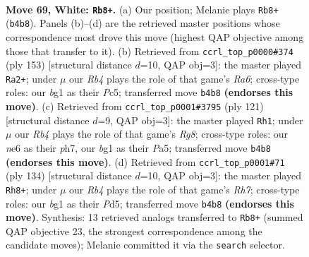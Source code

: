 \documentclass[11pt]{article}
\begin{document}
\clearpage

\begin{figure}[p]\centering
\begin{subfigure}{0.46\textwidth}\centering
\resizebox{\linewidth}{!}{%
\newchessgame
\chessboard[
  setfen={7k/8/3Nn3/P7/1R6/7r/2K5/6b1 w - - 5 69},
  showmover=false,
  pgfstyle=straightmove, color=movearrow, markmove={b4-b8}
]}
\caption{}
\end{subfigure}\hfill
\begin{subfigure}{0.46\textwidth}\centering
\resizebox{\linewidth}{!}{%
\newchessgame
\chessboard[
  setfen={8/4R3/8/2p4k/2P5/r7/4K3/8 b - - 11 77},
  showmover=false,
  pgfstyle=straightmove, color=movearrow, markmove={a3-a2}
]}
\caption{}
\end{subfigure}
\\[4pt]
\begin{subfigure}{0.46\textwidth}\centering
\resizebox{\linewidth}{!}{%
\newchessgame
\chessboard[
  setfen={2R2K2/7P/p7/p7/8/3k4/8/6r1 b - - 14 61},
  showmover=false,
  pgfstyle=straightmove, color=movearrow, markmove={g1-h1}
]}
\caption{}
\end{subfigure}\hfill
\begin{subfigure}{0.46\textwidth}\centering
\resizebox{\linewidth}{!}{%
\newchessgame
\chessboard[
  setfen={2k5/7R/3p4/K2P4/2r5/8/8/8 w - - 7 68},
  showmover=false,
  pgfstyle=straightmove, color=movearrow, markmove={h7-h8}
]}
\caption{}
\end{subfigure}
\caption{\textbf{Move 69, White: \texttt{Rb8+}.} (a) Our position; Melanie plays \texttt{Rb8+} (\texttt{b4b8}). Panels (b)--(d) are the retrieved master positions whose correspondence most drove this move (highest QAP objective among those that transfer to it). (b) Retrieved from \texttt{ccrl\_top\_p0000\#374} (ply 153) [structural distance $d$=10, QAP obj=3]: the master played \texttt{Ra2+}; under $\mu$ our \emph{Rb4} plays the role of that game's \emph{Ra6}; cross-type roles: our \emph{b}g1 as their \emph{P}c5; transferred move \texttt{b4b8} \textbf{(endorses this move)}. (c) Retrieved from \texttt{ccrl\_top\_p0001\#3795} (ply 121) [structural distance $d$=9, QAP obj=3]: the master played \texttt{Rh1}; under $\mu$ our \emph{Rb4} plays the role of that game's \emph{Rg8}; cross-type roles: our \emph{n}e6 as their \emph{p}h7, our \emph{b}g1 as their \emph{P}a5; transferred move \texttt{b4b8} \textbf{(endorses this move)}. (d) Retrieved from \texttt{ccrl\_top\_p0001\#71} (ply 134) [structural distance $d$=10, QAP obj=3]: the master played \texttt{Rh8+}; under $\mu$ our \emph{Rb4} plays the role of that game's \emph{Rh7}; cross-type roles: our \emph{b}g1 as their \emph{P}d5; transferred move \texttt{b4b8} \textbf{(endorses this move)}. Synthesis: 13 retrieved analogs transferred to \texttt{Rb8+} (summed QAP objective 23, the strongest correspondence among the candidate moves); Melanie committed it via the \texttt{search} selector.}
\label{fig:thought-m136}
\end{figure}
\end{document}
